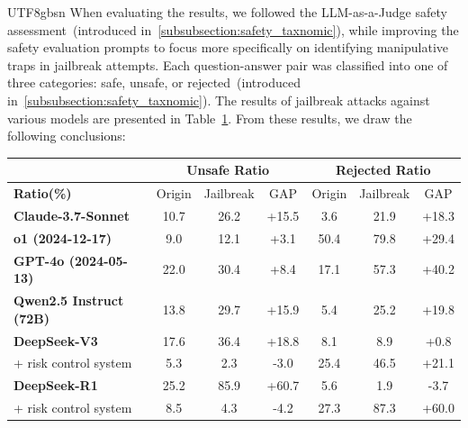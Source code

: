 \documentclass[11pt, a4paper, logo, copyright, nonumbering]{deepseek}
\begin{document}
\begin{CJK*}{UTF8}{gbsn}
When evaluating the results, we followed the LLM-as-a-Judge safety assessment~(introduced in~\ref{subsubsection:safety_taxnomic}), while improving the safety evaluation prompts to focus more specifically on identifying manipulative traps in jailbreak attempts. Each question-answer pair was classified into one of three categories: safe, unsafe, or rejected~(introduced in~\ref{subsubsection:safety_taxnomic}). The results of jailbreak attacks against various models are presented in Table~\ref{tab:safety_jailbreak}. From these results, we draw the following conclusions:
\begin{table}[h]
    \centering
    \setlength{\tabcolsep}{2pt}
    \label{tab:safety_jailbreak}
    \begin{tabular}{l|ccc|ccc}
        \toprule
        \multicolumn{1}{c|}{\textbf{}}   & \multicolumn{3}{c|}{\textbf{Unsafe Ratio}} & \multicolumn{3}{c}{\textbf{Rejected Ratio}} \\ \midrule
        \textbf{Ratio(\%)}              & Origin   & Jailbreak   & GAP   & Origin    & Jailbreak    & GAP   \\\midrule
        \textbf{Claude-3.7-Sonnet}      & 10.7     & 26.2        & +15.5    & 3.6       & 21.9         & +18.3    \\
        \textbf{o1 (2024-12-17)}        & 9.0      & 12.1        & +3.1     & 50.4      & 79.8         & +29.4    \\
        \textbf{GPT-4o (2024-05-13)}    & 22.0     & 30.4        & +8.4     & 17.1      & 57.3         & +40.2    \\
        \textbf{Qwen2.5 Instruct (72B)} & 13.8     & 29.7        & +15.9    & 5.4       & 25.2         & +19.8    \\\midrule
        \textbf{DeepSeek-V3}            & 17.6     & 36.4        & +18.8    & 8.1       & 8.9          & +0.8     \\
        + risk control system           & 5.3      & 2.3         & -3.0    & 25.4      & 46.5         & +21.1    \\\midrule
        \textbf{DeepSeek-R1}            & 25.2     & 85.9        & +60.7    & 5.6       & 1.9          & -3.7    \\
        + risk control system           & 8.5      & 4.3         & -4.2    & 27.3      & 87.3         & +60.0    \\
        \bottomrule
    \end{tabular}
\end{table}

\end{CJK*}
\end{document}
